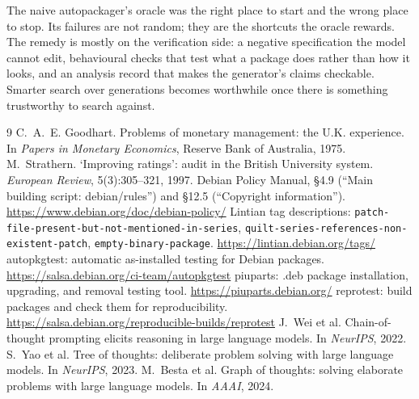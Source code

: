 \documentclass[11pt]{article}
\begin{document}
The naive autopackager's oracle was the right place to start and the wrong
place to stop. Its failures are not random; they are the shortcuts the
oracle rewards. The remedy is mostly on the verification side: a negative
specification the model cannot edit, behavioural checks that test what a
package does rather than how it looks, and an analysis record that makes
the generator's claims checkable. Smarter search over generations becomes
worthwhile once there is something trustworthy to search against.

\begin{thebibliography}{9}
C.~A.~E. Goodhart. Problems of monetary management: the U.K. experience.
In \emph{Papers in Monetary Economics}, Reserve Bank of Australia, 1975.
M.~Strathern. `Improving ratings': audit in the British University system.
\emph{European Review}, 5(3):305--321, 1997.
Debian Policy Manual, \S4.9 (``Main building script: debian/rules'') and
\S12.5 (``Copyright information''). \url{https://www.debian.org/doc/debian-policy/}
\sloppy Lintian tag descriptions: \texttt{patch-file-present-but-not-mentioned-in-series},
\texttt{quilt-series-references-non-existent-patch},
\texttt{empty-binary-package}. \url{https://lintian.debian.org/tags/}
autopkgtest: automatic as-installed testing for Debian packages.
\url{https://salsa.debian.org/ci-team/autopkgtest}
piuparts: .deb package installation, upgrading, and removal testing tool.
\url{https://piuparts.debian.org/}
reprotest: build packages and check them for reproducibility.
\url{https://salsa.debian.org/reproducible-builds/reprotest}
J.~Wei et al. Chain-of-thought prompting elicits reasoning in large language
models. In \emph{NeurIPS}, 2022.
S.~Yao et al. Tree of thoughts: deliberate problem solving with large
language models. In \emph{NeurIPS}, 2023.
M.~Besta et al. Graph of thoughts: solving elaborate problems with large
language models. In \emph{AAAI}, 2024.
\end{thebibliography}
\end{document}
